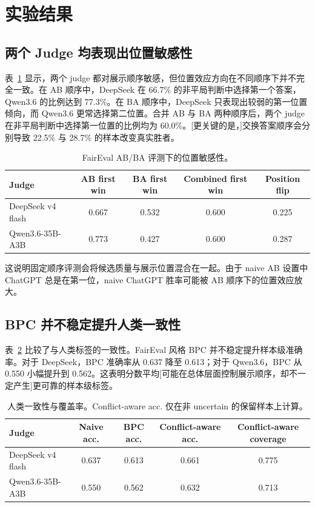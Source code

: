 \documentclass[11pt]{ctexart}
\begin{document}
\section{实验结果}

\subsection{两个 Judge 均表现出位置敏感性}

表~\ref{tab:position-zh} 显示，两个 judge 都对展示顺序敏感，但位置效应方向在不同顺序下并不完全一致。在 AB 顺序中，DeepSeek 在 66.7\% 的非平局判断中选择第一个答案，Qwen3.6 的比例达到 77.3\%。在 BA 顺序中，DeepSeek 只表现出较弱的第一位置倾向，而 Qwen3.6 更常选择第二位置。合并 AB 与 BA 两种顺序后，两个 judge 在非平局判断中选择第一位置的比例均为 60.0\%。[更关键的是，]交换答案顺序会分别导致 22.5\% 与 28.7\% 的样本改变真实胜者。

\begin{table}[h]
\centering
\begin{tabular}{lcccc}
\toprule
Judge & AB first win & BA first win & Combined first win & Position flip \\
\midrule
DeepSeek v4 flash & 0.667 & 0.532 & 0.600 & 0.225 \\
Qwen3.6-35B-A3B & 0.773 & 0.427 & 0.600 & 0.287 \\
\bottomrule
\end{tabular}
\caption{FairEval AB/BA 评测下的位置敏感性。}
\label{tab:position-zh}
\end{table}

这说明固定顺序评测会将候选质量与展示位置混合在一起。由于 naive AB 设置中 ChatGPT 总是在第一位，naive ChatGPT 胜率可能被 AB 顺序下的位置效应放大。

\subsection{BPC 并不稳定提升人类一致性}

表~\ref{tab:agreement-zh} 比较了与人类标签的一致性。FairEval 风格 BPC 并不稳定提升样本级准确率。对于 DeepSeek，BPC 准确率从 0.637 降至 0.613；对于 Qwen3.6，BPC 从 0.550 小幅提升到 0.562。这表明分数平均[可能在总体层面控制展示顺序，却不一定产生]更可靠的样本级标签。

\begin{table}[h]
\centering
\begin{tabular}{lcccc}
\toprule
Judge & Naive acc. & BPC acc. & Conflict-aware acc. & Conflict-aware coverage \\
\midrule
DeepSeek v4 flash & 0.637 & 0.613 & 0.661 & 0.775 \\
Qwen3.6-35B-A3B & 0.550 & 0.562 & 0.632 & 0.713 \\
\bottomrule
\end{tabular}
\caption{人类一致性与覆盖率。Conflict-aware acc. 仅在非 uncertain 的保留样本上计算。}
\label{tab:agreement-zh}
\end{table}
\end{document}
